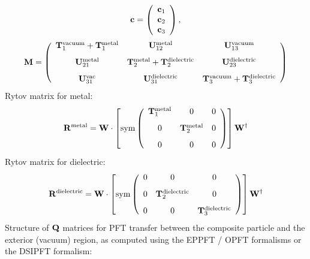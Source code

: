 \documentclass[letterpaper]{article}
\begin{document}
$$ \mathbf{c}=
   \left(\begin{array}{c} \mathbf{c}_1 \\ \mathbf{c}_2 \\ \mathbf{c}_3 \end{array}\right),
$$
$$ \mathbf{M}
    =
   \left(\begin{array}{ccc}
     \mathbf{T}_{1}^{\hbox{\scriptsize{vacuum}}} + \mathbf{T}_{1}^{\hbox{\scriptsize{metal}}}
   & \mathbf{U}_{12}^{\hbox{\scriptsize{metal}}}
   & \mathbf{U}_{13}^{\hbox{\scriptsize{vacuum}}}
\\[8pt]
     \mathbf{U}_{21}^{\hbox{\scriptsize{metal}}}
   & \mathbf{T}_{2}^{\hbox{\scriptsize{metal}}} + \mathbf{T}_{2}^{\hbox{\scriptsize{dielectric}}}
   & \mathbf{U}_{23}^{\hbox{\scriptsize{dielectric}}}
\\[8pt]
     \mathbf{U}_{31}^{\hbox{\scriptsize{vac}}}
   & \mathbf{U}_{31}^{\hbox{\scriptsize{dielectric}}}
   & \mathbf{T}_{3}^{\hbox{\scriptsize{vacuum}}} + \mathbf{T}_{3}^{\hbox{\scriptsize{dielectric}}}
   \end{array}\right)
$$
Rytov matrix for metal: 
$$ \mathbf{R}^{\hbox{\scriptsize{metal}}}
    = \mathbf{W}\cdot
   \left[
   \text{sym}
   \left(\begin{array}{ccc}
     \mathbf{T}_{1}^{\hbox{\scriptsize{metal}}}
   & 0
   & 0
\\[8pt]
     0
   & \mathbf{T}_{2}^{\hbox{\scriptsize{metal}}} 
   & 0
\\[8pt]
     0 
   & 0
   & 0
   \end{array}\right)
   \right]
   \mathbf{W}^\dagger
$$
Rytov matrix for dielectric: 
$$ \mathbf{R}^{\hbox{\scriptsize{dielectric}}}
    = \mathbf{W}\cdot
   \left[
   \text{sym}
   \left(\begin{array}{ccc}
     0
   & 0
   & 0
\\[8pt]
     0
   & \mathbf{T}_{2}^{\hbox{\scriptsize{dielectric}}} 
   & 0
\\[8pt]
     0 
   & 0
   & \mathbf{T}_{3}^{\hbox{\scriptsize{dielectric}}} 
   \end{array}\right)
   \right]
   \mathbf{W}^\dagger
$$
Structure of $\mathbf{Q}$ matrices for PFT transfer between the 
composite particle and the exterior (vacuum) region, as
computed using the EPPFT / OPFT formalisms or the DSIPFT 
formalism:
\end{document}
